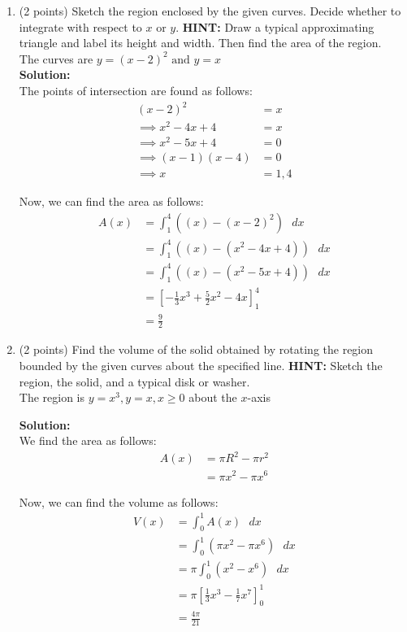 \documentclass[paper=a4, fontsize=11pt]{scrartcl} %
\numberwithin{equation}{section} %
\numberwithin{figure}{section} %
\numberwithin{table}{section} %
\begin{document}
\begin{enumerate}
\setlength{\itemsep}{0.45in}
\item (2 points) Sketch the region enclosed by the given curves.  Decide whether to integrate with respect to $x$ or $y$.  \textbf{HINT:} Draw a typical approximating triangle and label its height and width.  Then find the area of the region.\\

The curves are $\displaystyle y=(x-2)^2 \text{ and } y=x$\\

\noindent\textbf{Solution:}\\
The points of intersection are found as follows:
\begin{align*}
(x-2)^2 &= x \\
\implies x^2 -4x + 4 &= x\\
\implies x^2 - 5x + 4 &= 0\\
\implies (x-1)(x-4) &= 0\\
\implies x &= 1,4
\end{align*}

Now, we can find the area as follows:
\begin{align*}
A(x) &= \int_1^4 \left( (x) - (x-2)^2 \right) \text{  } dx \\
&= \int_1^4 \left( (x) - (x^2-4x+4) \right) \text{  } dx \\
&= \int_1^4 \left( (x) - (x^2 - 5x + 4) \right) \text{  } dx \\
&= \left[ -\frac{1}{3}x^3 + \frac{5}{2}x^2 - 4x\right]_1^4\\
&= \frac{9}{2}
\end{align*}

\item (2 points) Find the volume of the solid obtained by rotating the region bounded by the given curves about the specified line.  \textbf{HINT:} Sketch the region, the solid, and a typical disk or washer.\\

The region is $\displaystyle y=x^3, y=x, x \ge 0$ about the $x$-axis

\noindent\textbf{Solution:}\\
We find the area as follows:
\begin{align*}
A(x) &= \pi R^2 - \pi r^2\\
&= \pi x^2 - \pi x^6
\end{align*}

Now, we can find the volume as follows:
\begin{align*}
V(x) &= \int_0^1 A(x) \text{  } dx \\
&= \int_0^1 \left( \pi x^2 - \pi x^6 \right) \text{  } dx \\
&=  \pi  \int_0^1  \left(x^2 - x^6 \right) \text{  } dx \\
&=   \pi \left[ \frac{1}{3}x^3 - \frac{1}{7}x^7 \right]_0^1\\
&= \frac{4 \pi}{21}
\end{align*}


\end{enumerate}
\end{document}
